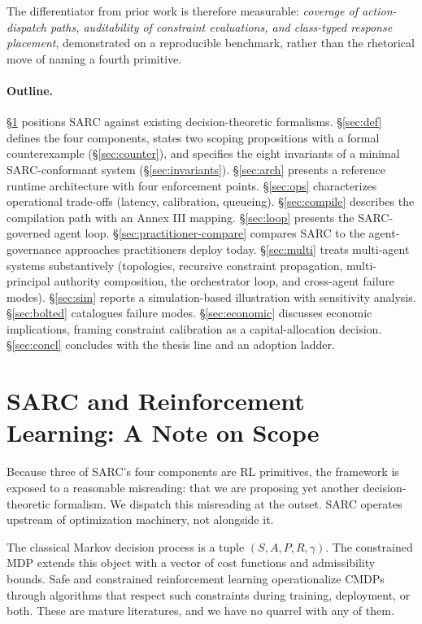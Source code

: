\documentclass[11pt,a4paper]{article}
\theoremstyle{remark}
\begin{document}
The differentiator from prior work is therefore measurable: \emph{coverage of action-dispatch paths, auditability of constraint evaluations, and class-typed response placement}, demonstrated on a reproducible benchmark, rather than the rhetorical move of naming a fourth primitive.

\paragraph{Outline.} \S\ref{sec:scope} positions SARC against existing decision-theoretic formalisms. \S\ref{sec:def} defines the four components, states two scoping propositions with a formal counterexample (\S\ref{sec:counter}), and specifies the eight invariants of a minimal SARC-conformant system (\S\ref{sec:invariants}). \S\ref{sec:arch} presents a reference runtime architecture with four enforcement points. \S\ref{sec:ops} characterizes operational trade-offs (latency, calibration, queueing). \S\ref{sec:compile} describes the compilation path with an Annex III mapping. \S\ref{sec:loop} presents the SARC-governed agent loop. \S\ref{sec:practitioner-compare} compares SARC to the agent-governance approaches practitioners deploy today. \S\ref{sec:multi} treats multi-agent systems substantively (topologies, recursive constraint propagation, multi-principal authority composition, the orchestrator loop, and cross-agent failure modes). \S\ref{sec:sim} reports a simulation-based illustration with sensitivity analysis. \S\ref{sec:bolted} catalogues failure modes. \S\ref{sec:economic} discusses economic implications, framing constraint calibration as a capital-allocation decision. \S\ref{sec:concl} concludes with the thesis line and an adoption ladder.

\section{SARC and Reinforcement Learning: A Note on Scope}\label{sec:scope}

Because three of SARC's four components are RL primitives, the framework is exposed to a reasonable misreading: that we are proposing yet another decision-theoretic formalism. We dispatch this misreading at the outset. SARC operates upstream of optimization machinery, not alongside it.

The classical Markov decision process \cite{puterman1994mdp} is a tuple $(S, A, P, R, \gamma)$. The constrained MDP \cite{altman1999cmdp} extends this object with a vector of cost functions and admissibility bounds. Safe and constrained reinforcement learning \cite{garcia2015safe,achiam2017cpo,ray2019benchmarking,stooke2020responsive,yang2021wcsac} operationalize CMDPs through algorithms that respect such constraints during training, deployment, or both. These are mature literatures, and we have no quarrel with any of them.
\end{document}
